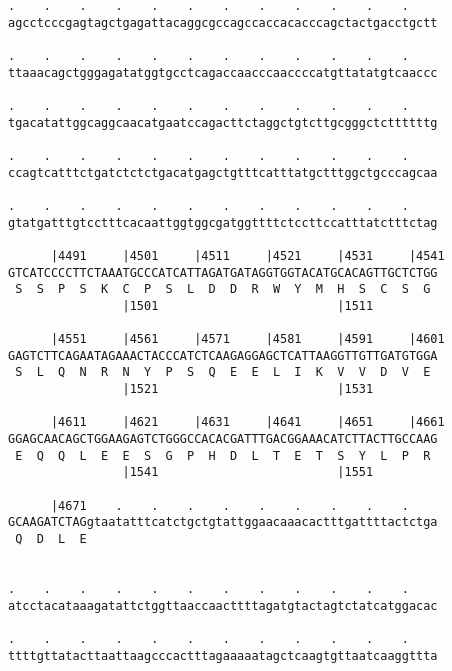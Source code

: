 \documentclass{article}
\begin{document}
\begin{Verbatim}
.    .    .    .    .    .    .    .    .    .    .    .    
agcctcccgagtagctgagattacaggcgccagccaccacacccagctactgacctgctt
                                                            
.    .    .    .    .    .    .    .    .    .    .    .    
ttaaacagctgggagatatggtgcctcagaccaacccaaccccatgttatatgtcaaccc
                                                            
.    .    .    .    .    .    .    .    .    .    .    .    
tgacatattggcaggcaacatgaatccagacttctaggctgtcttgcgggctcttttttg
                                                            
.    .    .    .    .    .    .    .    .    .    .    .    
ccagtcatttctgatctctctgacatgagctgtttcatttatgctttggctgcccagcaa
                                                            
.    .    .    .    .    .    .    .    .    .    .    .    
gtatgatttgtcctttcacaattggtggcgatggttttctccttccatttatctttctag
                                                            
      |4491     |4501     |4511     |4521     |4531     |4541
GTCATCCCCTTCTAAATGCCCATCATTAGATGATAGGTGGTACATGCACAGTTGCTCTGG
 S  S  P  S  K  C  P  S  L  D  D  R  W  Y  M  H  S  C  S  G 
                |1501                         |1511         
  
      |4551     |4561     |4571     |4581     |4591     |4601
GAGTCTTCAGAATAGAAACTACCCATCTCAAGAGGAGCTCATTAAGGTTGTTGATGTGGA
 S  L  Q  N  R  N  Y  P  S  Q  E  E  L  I  K  V  V  D  V  E 
                |1521                         |1531         
  
      |4611     |4621     |4631     |4641     |4651     |4661
GGAGCAACAGCTGGAAGAGTCTGGGCCACACGATTTGACGGAAACATCTTACTTGCCAAG
 E  Q  Q  L  E  E  S  G  P  H  D  L  T  E  T  S  Y  L  P  R 
                |1541                         |1551         
  
      |4671    .    .    .    .    .    .    .    .    .    
GCAAGATCTAGgtaatatttcatctgctgtattggaacaaacactttgattttactctga
 Q  D  L  E                                                 
                                                            
  
.    .    .    .    .    .    .    .    .    .    .    .    
atcctacataaagatattctggttaaccaacttttagatgtactagtctatcatggacac
                                                            
.    .    .    .    .    .    .    .    .    .    .    .    
ttttgttatacttaattaagcccactttagaaaaatagctcaagtgttaatcaaggttta
                                                            

\end{Verbatim}
\end{document}
